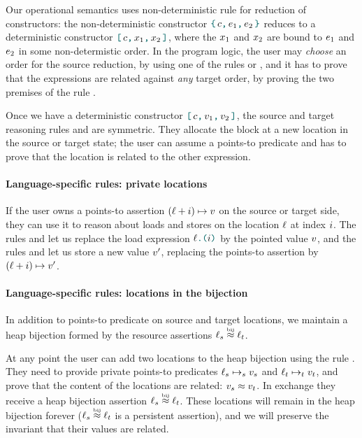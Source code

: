 Our operational semantics uses non-deterministic rule for reduction of constructors: the non-deterministic constructor $\datalangBlock{c}{\datalangExpr_1}{\datalangExpr_2}$ reduces to a deterministic constructor $\datalangBlockDet{c}{\datalangVar_1}{\datalangVar_2}$, where the $\datalangVar_1$ and $\datalangVar_2$ are bound to $\datalangExpr_1$ and $\datalangExpr_2$ in some non-determistic order.
%
In the program logic, the user may \emph{choose} an order for the source reduction, by using one of the rules  or , and it has to prove that the expressions are related against \emph{any} target order, by proving the two premises of the rule .

Once we have a deterministic constructor $\datalangBlockDet{c}{\datalangVal_1}{\datalangVal_2}$, the source and target reasoning rules  and  are symmetric.
%
They allocate the block at a new location in the source or target state; the user can assume a points-to predicate and has to prove that the location is related to the other expression.

\paragraph{Language-specific rules: private locations}
%
If the user owns a points-to assertion $(\datalangLoc + \datalangIdx) \iPointsto \datalangVal$ on the source or target side, they can use it to reason about loads and stores on the location $\datalangLoc$ at index $\datalangIdx$. The rules  and  let us replace the load expression $\datalangLoad{\datalangLoc}{\datalangIdx}$ by the pointed value $\datalangVal$, and the rules  and  let us store a new value $\datalangVal'$, replacing the points-to assertion by $(\datalangLoc + \datalangIdx) \iPointsto \datalangVal'$.

\paragraph{Language-specific rules: locations in the bijection}
%
In addition to points-to predicate on source and target locations, we maintain a heap bijection formed by the resource assertions $\datalangLoc_s \iInBij \datalangLoc_t$.

At any point the user can add two locations to the heap bijection using the rule . They need to provide private points-to predicates $\datalangLoc_s \iPointsto_s \datalangVal_s$ and $\datalangLoc_t \iPointsto_t \datalangVal_t$, and prove that the content of the locations are related: $\datalangVal_s \iSimilar \datalangVal_t$.
%
In exchange they receive a heap bijection assertion $\datalangLoc_s \iInBij \datalangLoc_t$. These locations will remain in the heap bijection forever ($\datalangLoc_s \iInBij \datalangLoc_t$ is a persistent assertion), and we will preserve the invariant that their values are related.

